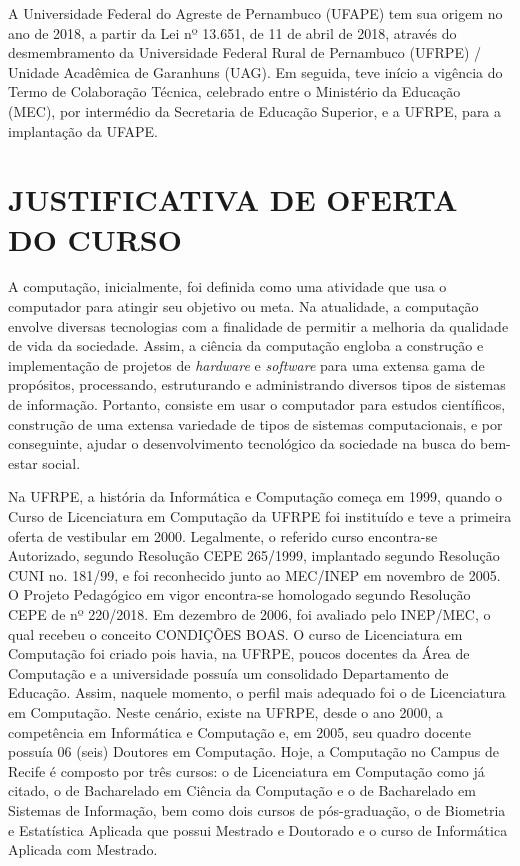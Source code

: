 \documentclass[
	12pt,				%
	openright,			%
  oneside,     %
	a4paper,			%
	chapter=TITLE,		%
	english,			%
	french,				%
	spanish,			%
	brazil				%
	]{abntex2}
\begin{document}
A Universidade Federal do Agreste de Pernambuco (UFAPE) tem sua origem no ano de 2018, a partir da Lei nº 13.651, de 11 de abril de 2018, através do desmembramento da Universidade Federal Rural de Pernambuco (UFRPE) / Unidade Acadêmica de Garanhuns (UAG). Em seguida, teve início a vigência do Termo de Colaboração Técnica, celebrado entre o Ministério da Educação (MEC), por intermédio da Secretaria de Educação Superior, e a UFRPE, para a implantação da UFAPE.

\chapter{JUSTIFICATIVA DE OFERTA DO CURSO}

A computação, inicialmente, foi definida como uma atividade que usa o computador para atingir seu objetivo ou meta. Na atualidade, a computação envolve diversas tecnologias com a finalidade de permitir a melhoria da qualidade de vida da sociedade. Assim, a ciência da computação engloba a construção e implementação de projetos de \textit{hardware} e \textit{software} para uma extensa gama de propósitos, processando, estruturando e administrando diversos tipos de sistemas de informação. Portanto, consiste em usar o computador para estudos científicos, construção de uma extensa variedade de tipos de sistemas computacionais, e por conseguinte, ajudar o desenvolvimento tecnológico da sociedade na busca do bem-estar social.

Na UFRPE, a história da Informática e Computação começa em 1999, quando o Curso de Licenciatura em Computação da UFRPE foi instituído e teve a primeira oferta de vestibular em 2000. Legalmente, o referido curso encontra-se Autorizado, segundo Resolução CEPE 265/1999, implantado segundo Resolução CUNI no. 181/99, e foi reconhecido junto ao MEC/INEP em novembro de 2005. O Projeto Pedagógico em vigor encontra-se homologado segundo Resolução CEPE de nº 220/2018. Em dezembro de 2006, foi avaliado pelo INEP/MEC, o qual recebeu o conceito CONDIÇÕES BOAS. O curso de Licenciatura em Computação foi criado pois havia, na UFRPE, poucos docentes da Área de Computação e a universidade possuía um consolidado Departamento de Educação. Assim, naquele momento, o perfil mais adequado foi o de Licenciatura em Computação. Neste cenário, existe na UFRPE, desde o ano 2000, a competência em Informática e Computação e, em 2005, seu quadro docente possuía 06 (seis) Doutores em Computação. Hoje, a Computação no Campus de Recife é composto por três cursos: o de Licenciatura em Computação como já citado, o de Bacharelado em Ciência da Computação e o de Bacharelado em Sistemas de Informação, bem como dois cursos de pós-graduação, o de Biometria e Estatística Aplicada que possui Mestrado e Doutorado e o curso de Informática Aplicada com Mestrado. 
\end{document}
